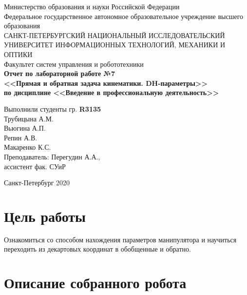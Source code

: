 \documentclass{article}
\begin{document}
	\pagestyle{empty}
	\begin{titlepage}
	\begin{center}
        \large{
            Министерство образования и науки Российской Федерации\\Федеральное государственное автономное образовательное учреждение высшего образования}\\
        \vspace*{3em plus 7em minus 6em}
        \Large
        САНКТ-ПЕТЕРБУРГСКИЙ НАЦИОНАЛЬНЫЙ ИССЛЕДОВАТЕЛЬСКИЙ \\УНИВЕРСИТЕТ ИНФОРМАЦИОННЫХ ТЕХНОЛОГИЙ, МЕХАНИКИ И ОПТИКИ\\
        \vspace*{3em plus 7em minus 6em}
        \Large
        Факультет систем управления и робототехники\\
        \vspace*{7em plus 7em minus 6em}
        \LARGE
        {\bf
        Отчет по лабораторной работе №7 \\ <<Прямая и обратная задача кинематики. DH-параметры>> \\по дисциплине <<Введение в профессиональную деятельность>>}\\
    \end{center}
	\begin{flushright}
		\Large
		\vspace*{10em plus 11em minus 9em}
		Выполнили студенты гр. {\textbf {R3135}}\\
		Трубицына А.М.\\
		Вьюгина А.П.\\
		Репин А.В.\\
		Макаренко К.С.\\
		Преподаватель: Перегудин А.А.,\\
		ассистент фак. СУиР		
	\end{flushright}
	\vspace*{15em plus 7em minus 6em}
	\begin{center}
		Санкт-Петербург 2020
	\end{center}
	\end{titlepage}


\section{Цель работы}
Ознакомиться со способом нахождения параметров манипулятора и научиться переходить из декартовых координат в обобщенные и обратно.

\section{Описание собранного робота}
\end{document}
